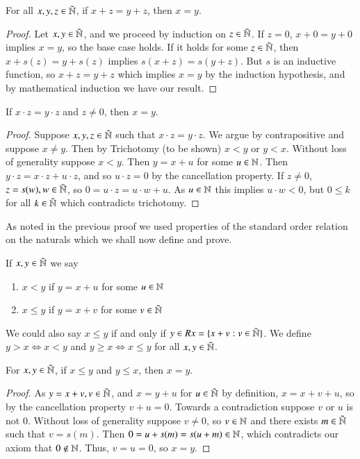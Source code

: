 \begin{proposition}\label{prop:1.1.11}
    For all $x,y,z \in \tilde{\mathbb N}$, if $x+z = y+z$, then $x = y$.
\end{proposition}
\begin{proof}
    Let $x,y \in \tilde{\mathbb N}$, and we proceed by induction on $z \in \tilde{\mathbb N}$. If $z = 0$, $x+0 = y+0$ implies $x = y$, so the base case holds. If it holds for some $z \in \tilde{\mathbb N}$, then $x+s(z) = y+s(z)$ implies $s(x+z) = s(y+z)$. But $s$ is an inductive function, so $x +z = y+z$ which implies $x = y$ by the induction hypothesis, and by mathematical induction we have our result.
\end{proof}

\begin{proposition}\label{prop:1.1.12}
    If $x \cdot z = y \cdot z$ and $z \neq 0$, then $x =y$.
\end{proposition}
\begin{proof}
    Suppose $x,y,z \in \tilde{\mathbb N}$ such that $x\cdot z = y\cdot z$. We argue by contrapositive and suppose $x \neq y$. Then by Trichotomy (to be shown) $x < y$ or $y < x$. Without loss of generality suppose $x < y$. Then $y = x+u$ for some $u \in \mathbb N$. Then $y\cdot z = x\cdot z + u\cdot z$, and so $u\cdot z = 0$ by the cancellation property. If $z \neq 0$, $z = s(w), w \in \tilde{\mathbb N}$, so $0 = u\cdot z = u\cdot w + u$. As $u \in \mathbb N$ this implies $u\cdot w < 0$, but $0 \leq k$ for all $k \in \tilde{\mathbb N}$ which contradicts trichotomy.
\end{proof}

As noted in the previous proof we used properties of the standard order relation on the naturals which we shall now define and prove.

\begin{definition}
    If $x,y \in \tilde{\mathbb N}$ we say \begin{enumerate}
        \item $x < y$ if $y = x+u$ for some $u \in \mathbb N$
        \item $x \leq y$ if $y = x+v$ for some $v \in \tilde{\mathbb N}$
    \end{enumerate}
\end{definition}

We could also say $x \leq y$ if and only if $y \in Rx = \{x+v:v \in \tilde{\mathbb N}\}$.  We define $y > x \iff x < y$ and $y \geq x \iff x \leq y$ for all $x,y \in \tilde{\mathbb N}$.

\begin{proposition}\label{prop:1.1.13}
    For $x,y \in \tilde{\mathbb N}$, if $x \leq y$ and $y \leq x$, then $x =y$.
\end{proposition}
\begin{proof}
    As $y = x+v, v \in \tilde{\mathbb N}$, and $x = y+u$ for $u \in \tilde{\mathbb N}$ by definition, $x = x+v+u$, so by the cancellation property $v + u = 0$. Towards a contradiction suppose $v$ or $u$ is not $0$. Without loss of generality suppose $v \neq 0$, so $v \in \mathbb N$ and there exists $m \in \tilde{\mathbb N}$ such that $v = s(m)$. Then $0 = u+s(m) = s(u+m) \in \mathbb N$, which contradicts our axiom that $0 \notin \mathbb N$. Thus, $v = u = 0$, so $x = y$.
\end{proof}

